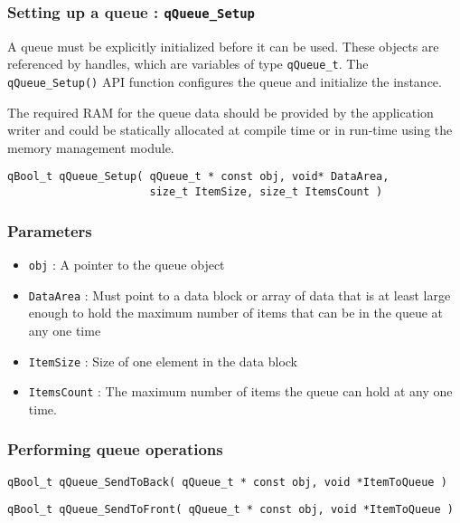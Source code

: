 \subsubsection{Setting up a queue : \texorpdfstring{\lstinline{qQueue_Setup}}{qQueue_Setup} }  \label{queuecreate}
A queue must be explicitly initialized before it can be used. 
\medskip
These objects are referenced by handles, which are variables of type \lstinline{qQueue_t}. The \lstinline{qQueue_Setup()} API function configures the queue and initialize the instance. 

The required RAM for the queue data should be provided by the application writer and could be statically allocated at compile time or in run-time using the memory management module.
\medskip
 
\begin{lstlisting}[style=CStyle]
qBool_t qQueue_Setup( qQueue_t * const obj, void* DataArea, 
                      size_t ItemSize, size_t ItemsCount )
\end{lstlisting}

\subsubsection*{Parameters}
\begin{itemize}
    \item \lstinline{obj} : A pointer to the queue object
    \item \lstinline{DataArea} : Must point to a data block or array of data that is at least large enough to hold the maximum number of items that can be in the queue at any one time
    \item \lstinline{ItemSize} : Size of one element in the data block
    \item \lstinline{ItemsCount} : The maximum number of items the queue can hold at any one time.
\end{itemize}      
    
\subsubsection{Performing queue operations}
\begin{lstlisting}[style=CStyle]
qBool_t qQueue_SendToBack( qQueue_t * const obj, void *ItemToQueue )
\end{lstlisting}

\begin{lstlisting}[style=CStyle]
qBool_t qQueue_SendToFront( qQueue_t * const obj, void *ItemToQueue )
\end{lstlisting}

